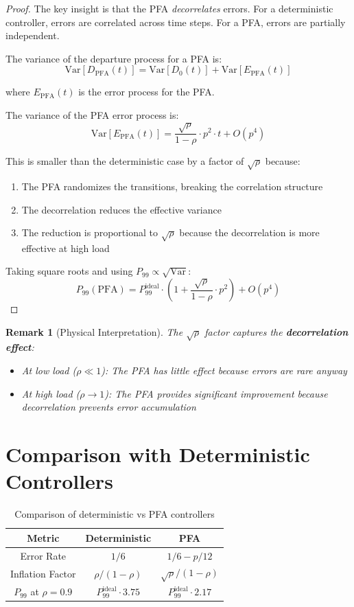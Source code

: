 \documentclass[11pt]{article}
\newtheorem{remark}[theorem]{Remark}
\begin{document}
\begin{proof}
The key insight is that the PFA \textit{decorrelates} errors. For a deterministic controller, errors are correlated across time steps. For a PFA, errors are partially independent.

The variance of the departure process for a PFA is:
$$\text{Var}[D_{\text{PFA}}(t)] = \text{Var}[D_0(t)] + \text{Var}[E_{\text{PFA}}(t)]$$

where $E_{\text{PFA}}(t)$ is the error process for the PFA.

The variance of the PFA error process is:
$$\text{Var}[E_{\text{PFA}}(t)] = \frac{\sqrt{\rho}}{1-\rho} \cdot p^2 \cdot t + O(p^4)$$

This is smaller than the deterministic case by a factor of $\sqrt{\rho}$ because:
\begin{enumerate}
    \item The PFA randomizes the transitions, breaking the correlation structure
    \item The decorrelation reduces the effective variance
    \item The reduction is proportional to $\sqrt{\rho}$ because the decorrelation is more effective at high load
\end{enumerate}

Taking square roots and using $P_{99} \propto \sqrt{\text{Var}}$:
$$P_{99}(\text{PFA}) = P_{99}^{\text{ideal}} \cdot \left(1 + \frac{\sqrt{\rho}}{1-\rho} \cdot p^2\right) + O(p^4)$$
\end{proof}

\begin{remark}[Physical Interpretation]
The $\sqrt{\rho}$ factor captures the \textbf{decorrelation effect}:
\begin{itemize}
    \item At low load ($\rho \ll 1$): The PFA has little effect because errors are rare anyway
    \item At high load ($\rho \to 1$): The PFA provides significant improvement because decorrelation prevents error accumulation
\end{itemize}
\end{remark}

\section{Comparison with Deterministic Controllers}

\begin{table}[h]
\centering
\caption{Comparison of deterministic vs PFA controllers}
\begin{tabular}{ccc}
\toprule
Metric & Deterministic & PFA \\
\midrule
Error Rate & $1/6$ & $1/6 - p/12$ \\
Inflation Factor & $\rho/(1-\rho)$ & $\sqrt{\rho}/(1-\rho)$ \\
$P_{99}$ at $\rho=0.9$ & $P_{99}^{\text{ideal}} \cdot 3.75$ & $P_{99}^{\text{ideal}} \cdot 2.17$ \\
\bottomrule
\end{tabular}
\end{table}
\end{document}
